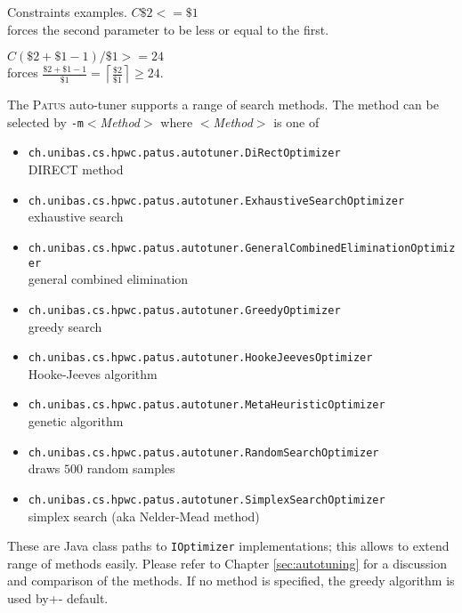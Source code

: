 \begin{example}{Constraints examples.}
	\noindent $C\$2<=\$1$\\
	\phantom{XXXX}forces the second parameter to be less or equal to the first.
	\bigskip
	
	\noindent $C(\$2+\$1-1)/\$1>=24$\\
	\phantom{XXXX}forces $\tfrac{\$2+\$1-1}{\$1} = \left\lceil \tfrac{\$2}{\$1} \right\rceil \geq 24$.
\end{example}

The \textsc{Patus} auto-tuner supports a range of search methods. The method can be selected by \texttt{-m}\textit{$<$Method$>$}
where \textit{$<$Method$>$} is one of
\begin{itemize}
	\item \texttt{ch.unibas.cs.hpwc.patus.autotuner.DiRectOptimizer}\\ DIRECT method
	\item \texttt{ch.unibas.cs.hpwc.patus.autotuner.ExhaustiveSearchOptimizer}\\ exhaustive search
	\item \texttt{ch.unibas.cs.hpwc.patus.autotuner.GeneralCombinedEliminationOptimizer}\\ general combined elimination
	\item \texttt{ch.unibas.cs.hpwc.patus.autotuner.GreedyOptimizer}\\ greedy search
	\item \texttt{ch.unibas.cs.hpwc.patus.autotuner.HookeJeevesOptimizer}\\ Hooke-Jeeves algorithm
	\item \texttt{ch.unibas.cs.hpwc.patus.autotuner.MetaHeuristicOptimizer}\\ genetic algorithm
	\item \texttt{ch.unibas.cs.hpwc.patus.autotuner.RandomSearchOptimizer}\\ draws $500$ random samples
	\item \texttt{ch.unibas.cs.hpwc.patus.autotuner.SimplexSearchOptimizer}\\ simplex search (aka Nelder-Mead method)
\end{itemize}
These are Java class paths to \texttt{IOptimizer} implementations; this allows to extend range of methods easily.
Please refer to Chapter \ref{sec:autotuning} for a discussion and comparison of the methods.
If no method is specified, the greedy algorithm is used by+- default.